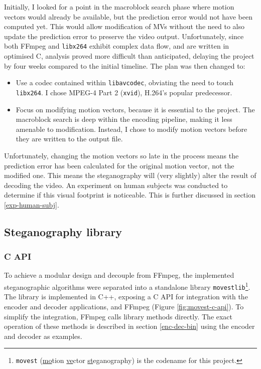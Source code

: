 \documentclass[12pt,british,twoside,notitlepage,usenames,dvipsnames,hypens,final]{report}
\numberwithin{equation}{section}
\numberwithin{figure}{section}
\begin{document}
Initially, I looked for a point in the macroblock search phase where motion vectors would already be available, but the prediction error would not have been computed yet. This would allow modification of MVs without the need to also update the prediction error to preserve the video output. Unfortunately, since both FFmpeg and \texttt{libx264} exhibit complex data flow, and are written in optimised C, analysis proved more difficult than anticipated, delaying the project by four weeks compared to the initial timeline. The plan was then changed to:
\begin{itemize}
\item Use a codec contained within \texttt{libavcodec}, obviating the need to touch \texttt{libx264}. I chose MPEG-4 Part 2 (\texttt{xvid}), H.264's popular predecessor.
\item Focus on modifying motion vectors, because it is essential to the project. The macroblock search is deep within the encoding pipeline, making it less amenable to modification. Instead, I chose to modify motion vectors before they are written to the output file.
\end{itemize}

Unfortunately, changing the motion vectors so late in the process means the prediction error has been calculated for the original motion vector, not the modified one. This means the steganography will (very slightly) alter the result of decoding the video. An experiment on human subjects was conducted to determine if this visual footprint is noticeable. This is further discussed in section \ref{exp-human-subj}.

\subsection{Steganography library}

\subsubsection{C API}

To achieve a modular design and decouple from FFmpeg, the implemented steganographic algorithms were separated into a standalone library \texttt{movestlib}\footnote{\texttt{movest} (\underline{mo}tion \underline{ve}ctor \underline {st}eganography) is the codename for this project.}. The library is implemented in C++, exposing a C API for integration with the encoder and decoder applications, and FFmpeg (Figure \ref{fig:movest-c-api}). To simplify the integration, FFmpeg calls library methods directly. The exact operation of these methods is described in section \ref{enc-dec-bin} using the encoder and decoder as examples.
\end{document}
